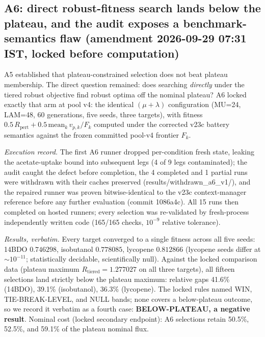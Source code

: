 
\subsection{A6: direct robust-fitness search lands below the plateau, and the audit exposes a benchmark-semantics flaw (amendment 2026-09-29 07:31 IST, locked before computation)}
\label{sec:a6}

A5 established that plateau-constrained selection does not beat plateau membership. The direct question remained: does searching \emph{directly} under the tiered robust objective find robust optima off the nominal plateau? A6 locked exactly that arm at pool v4: the identical $(\mu{+}\lambda)$ configuration (MU=24, LAM=48, 60 generations, five seeds, three targets), with fitness $0.5\,R_{\mathrm{pert}} + 0.5\,\mathrm{mean}_k\, v_{p,k}/F_k$ computed under the corrected v23c battery semantics against the frozen committed pool-v4 frontier $F_k$.

\textit{Execution record.} The first A6 runner dropped per-condition fresh state, leaking the acetate-uptake bound into subsequent legs (4 of 9 legs contaminated); the audit caught the defect before completion, the 4 completed and 1 partial runs were withdrawn with their caches preserved (results/withdrawn\_a6\_v1/), and the repaired runner was proven bitwise-identical to the v23c context-manager reference before any further evaluation (commit 1086a4c). All 15 runs then completed on hosted runners; every selection was re-validated by fresh-process independently written code (165/165 checks, $10^{-9}$ relative tolerance).

\textit{Results, verbatim.} Every target converged to a single fitness across all five seeds: 14BDO $0.746298$, isobutanol $0.778085$, lycopene $0.812866$ (lycopene seeds differ at $\sim$$10^{-11}$; statistically decidable, scientifically null). Against the locked comparison data (plateau maximum $R_{\mathrm{tiered}} = 1.277027$ on all three targets), all fifteen selections land strictly below the plateau maximum: relative gaps 41.6\% (14BDO), 39.1\% (isobutanol), 36.3\% (lycopene). The locked rules named WIN, TIE-BREAK-LEVEL, and NULL bands; none covers a below-plateau outcome, so we record it verbatim as a fourth case: \textbf{BELOW-PLATEAU, a negative result}. Nominal cost (locked secondary endpoint): A6 selections retain 50.5\%, 52.5\%, and 59.1\% of the plateau nominal flux.

